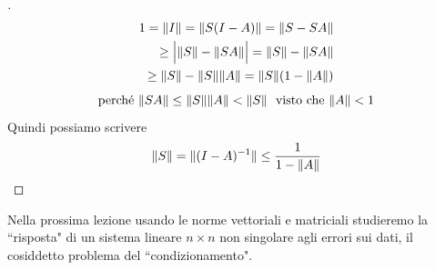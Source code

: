 \documentclass[12pt,a4paper]{article}
\DeclarePairedDelimiter{\norma}{\lVert}{\rVert}
\begin{document}
\begin{proof}[\unskip\nopunct]
\begin{equation*}
\begin{split}
1 =  \norma{I} = \norma{S(I-A)} = \norma{S-SA} \\ 
    \geq \Big | \norma{S} - \norma{SA} \Big | = \norma{S} - \norma{SA} \\
    \geq \norma{S} - \norma{S} \norma{A} = \norma{S} (1-\norma{A})
\end{split}
\end{equation*}
\begin{equation*}
    \text{perché} \  \norma{SA} \leq \norma{S} \norma{A} < \norma{S}\ \text{ visto che} \  \norma{A} < 1\\
\end{equation*}
Quindi possiamo scrivere
\begin{equation*}
    \norma{S} = \norma{(I-A)^{-1}} \leq \frac{1}{1-\norma{A}}
\end{equation*}
\end{proof}

Nella prossima lezione usando le norme vettoriali e matriciali studieremo la ``risposta" di un sistema lineare $n \times n$ non singolare agli errori sui dati, il cosiddetto problema del ``condizionamento".\\
\end{document}
